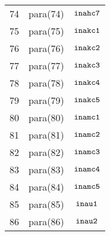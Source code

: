 \documentclass{article}
\begin{document}
\begin{center}
\begin{tabular}{|c|c|c|}
74 & para(74)  & $\mbox{\tt inahc7}$ \\ 
75 & para(75)  & $\mbox{\tt inakc1}$ \\ 
76 & para(76)  & $\mbox{\tt inakc2}$ \\ 
77 & para(77)  & $\mbox{\tt inakc3}$ \\ 
78 & para(78)  & $\mbox{\tt inakc4}$ \\ 
79 & para(79)  & $\mbox{\tt inakc5}$ \\ 
80 & para(80)  & $\mbox{\tt inamc1}$ \\ 
81 & para(81)  & $\mbox{\tt inamc2}$ \\ 
82 & para(82)  & $\mbox{\tt inamc3}$ \\ 
83 & para(83)  & $\mbox{\tt inamc4}$ \\ 
84 & para(84)  & $\mbox{\tt inamc5}$ \\ 
85 & para(85)  & $\mbox{\tt inau1}$ \\ 
86 & para(86)  & $\mbox{\tt inau2}$ \\ 
\hline
\end{tabular}
\end{center}
\end{document}

